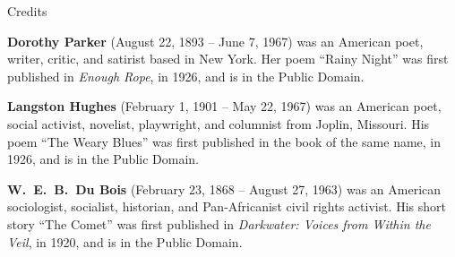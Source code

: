 \normalsize Credits
\vspace{0.5em}

\scriptsize

\vspace{0.5em}
\textbf{Dorothy Parker} (August 22, 1893 – June 7, 1967) was
an American poet, writer, critic, and satirist based in New
York. Her poem ``Rainy Night'' was first published in
\emph{Enough Rope}, in 1926, and is in the Public Domain.

\vspace{0.5em}
\textbf{Langston Hughes} (February 1, 1901 – May 22, 1967) was
an American poet, social activist, novelist, playwright, and
columnist from Joplin, Missouri. His poem ``The Weary
Blues'' was first published in the book of the same name, in
1926, and is in the Public Domain.

\vspace{0.5em}
\textbf{W.\ E.\ B.\ Du Bois} (February 23, 1868 – August 27,
1963) was an American sociologist, socialist, historian, and
Pan-Africanist civil rights activist. His short story ``The
Comet'' was first published in \emph{Darkwater: Voices from
Within the Veil}, in 1920, and is in the Public Domain.